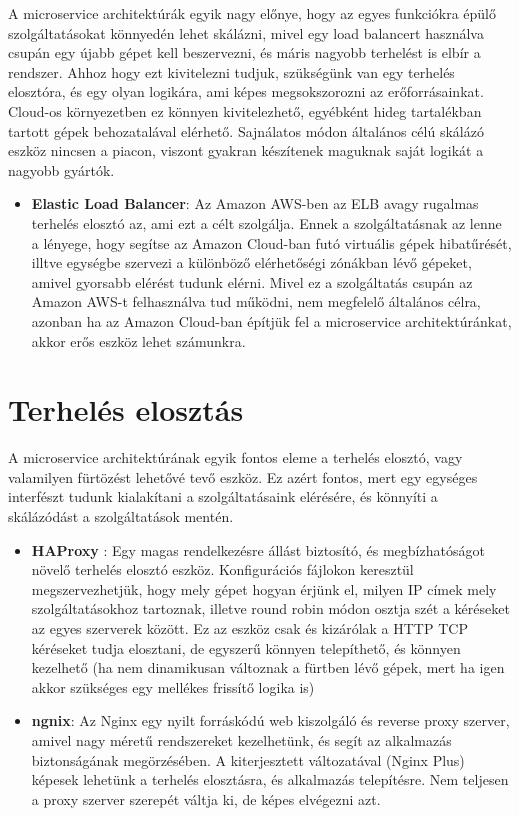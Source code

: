 \documentclass[11pt,magyar,a4paper,oneside,]{report}
\begin{document}
A microservice architektúrák egyik nagy előnye, hogy az egyes funkciókra
épülő szolgáltatásokat könnyedén lehet skálázni, mivel egy load
balancert használva csupán egy újabb gépet kell beszervezni, és máris
nagyobb terhelést is elbír a rendszer. Ahhoz hogy ezt kivitelezni
tudjuk, szükségünk van egy terhelés elosztóra, és egy olyan logikára,
ami képes megsokszorozni az erőforrásainkat. Cloud-os környezetben ez
könnyen kivitelezhető, egyébként hideg tartalékban tartott gépek
behozatalával elérhető. Sajnálatos módon általános célú skálázó eszköz
nincsen a piacon, viszont gyakran készítenek maguknak saját logikát a
nagyobb gyártók.

\begin{itemize}
\itemsep1pt\parskip0pt
\item
  \textbf{Elastic Load Balancer}\citep{elastic-load-balance}: Az Amazon
  AWS-ben az ELB avagy rugalmas terhelés elosztó az, ami ezt a célt
  szolgálja. Ennek a szolgáltatásnak az lenne a lényege, hogy segítse az
  Amazon Cloud-ban futó virtuális gépek hibatűrését, illtve egységbe
  szervezi a különböző elérhetőségi zónákban lévő gépeket, amivel
  gyorsabb elérést tudunk elérni. Mivel ez a szolgáltatás csupán az
  Amazon AWS-t felhasználva tud működni, nem megfelelő általános célra,
  azonban ha az Amazon Cloud-ban építjük fel a microservice
  architektúránkat, akkor erős eszköz lehet számunkra.
\end{itemize}

\section{Terhelés elosztás}\label{terheluxe9s-elosztuxe1s}

A microservice architektúrának egyik fontos eleme a terhelés elosztó,
vagy valamilyen fürtözést lehetővé tevő eszköz. Ez azért fontos, mert
egy egységes interfészt tudunk kialakítani a szolgáltatásaink elérésére,
és könnyíti a skálázódást a szolgáltatások mentén.

\begin{itemize}
\item
  \textbf{HAProxy}\citep{haproxy} \citep{LB-haproxy}: Egy magas
  rendelkezésre állást biztosító, és megbízhatóságot növelő terhelés
  elosztó eszköz. Konfigurációs fájlokon keresztül megszervezhetjük,
  hogy mely gépet hogyan érjünk el, milyen IP címek mely
  szolgáltatásokhoz tartoznak, illetve round robin módon osztja szét a
  kéréseket az egyes szerverek között. Ez az eszköz csak és kizárólak a
  HTTP TCP kéréseket tudja elosztani, de egyszerű könnyen telepíthető,
  és könnyen kezelhető (ha nem dinamikusan változnak a fürtben lévő
  gépek, mert ha igen akkor szükséges egy mellékes frissítő logika is)
\item
  \textbf{ngnix}\citep{nginx}: Az Nginx egy nyilt forráskódú web
  kiszolgáló és reverse proxy szerver, amivel nagy méretű rendszereket
  kezelhetünk, és segít az alkalmazás biztonságának megörzésében. A
  kiterjesztett változatával (Nginx Plus) képesek lehetünk a terhelés
  elosztásra, és alkalmazás telepítésre. Nem teljesen a proxy szerver
  szerepét váltja ki, de képes elvégezni azt.
\end{itemize}
\end{document}
